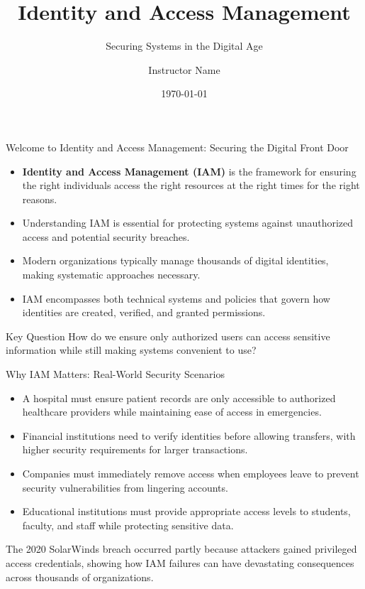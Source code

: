 \documentclass{beamer}
\title{Identity and Access Management}
\subtitle{Securing Systems in the Digital Age}
\author{Instructor Name}
\institute{School/College Name}
\date{\today}
\begin{document}
\begin{frame}
    \titlepage
\end{frame}

\begin{frame}{Welcome to Identity and Access Management: Securing the Digital Front Door}
    \begin{itemize}
        \item \textbf{Identity and Access Management (IAM)} is the framework for ensuring the right individuals access the right resources at the right times for the right reasons.
        \item Understanding IAM is essential for protecting systems against unauthorized access and potential security breaches.
        \item Modern organizations typically manage thousands of digital identities, making systematic approaches necessary.
        \item IAM encompasses both technical systems and policies that govern how identities are created, verified, and granted permissions.
    \end{itemize}
    
    \begin{alertblock}{Key Question}
        How do we ensure only authorized users can access sensitive information while still making systems convenient to use?
    \end{alertblock}
\end{frame}

\begin{frame}{Why IAM Matters: Real-World Security Scenarios}
    \begin{itemize}
        \item A hospital must ensure patient records are only accessible to authorized healthcare providers while maintaining ease of access in emergencies.
        \item Financial institutions need to verify identities before allowing transfers, with higher security requirements for larger transactions.
        \item Companies must immediately remove access when employees leave to prevent security vulnerabilities from lingering accounts.
        \item Educational institutions must provide appropriate access levels to students, faculty, and staff while protecting sensitive data.
    \end{itemize}
    
    \begin{example}
        The 2020 SolarWinds breach occurred partly because attackers gained privileged access credentials, showing how IAM failures can have devastating consequences across thousands of organizations.
    \end{example}
\end{frame}
\end{document}

